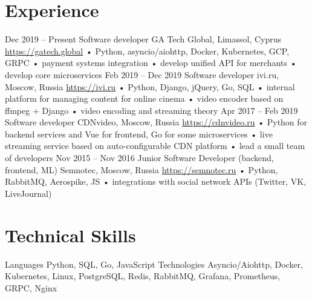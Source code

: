 \documentclass[11pt,a4paper]{moderncv}
\begin{document}
\maketitle

\section{Experience}
  \cventry
    {Dec 2019 – Present}
    {Software developer}
    {GA Tech Global, Limassol, Cyprus}
    {\url{https://gatech.global}}
    {}
    {
      • Python, asyncio/aiohttp, Docker, Kubernetes, GCP, GRPC\newline{}
      • payment systems integration\newline{}
      • develop unified API for merchants\newline{}
      • develop core microservices\newline{}
    }
  \cventry
    {Feb 2019 – Dec 2019}
    {Software developer}
    {ivi.ru, Moscow, Russia}
    {\url{https://ivi.ru}}
    {}
    {
      • Python, Django, jQuery, Go, SQL \newline{}
      • internal platform for managing content for online cinema \newline{}
      • video encoder based on ffmpeg + Django \newline{}
      • video encoding and streaming theory \newline{}
    }
  \cventry
    {Apr 2017 – Feb 2019}
    {Software developer}
    {CDNvideo, Moscow, Russia}
    {\url{https://cdnvideo.ru}}
    {}
    {
      • Python for backend services and Vue for frontend, Go for some microservices \newline{}
      • live streaming service based on auto-configurable CDN platform \newline{}
      • lead a small team of developers \newline{}
    }
  \cventry
    {Nov 2015 – Nov 2016}
    {Junior Software Developer (backend, frontend, ML)}
    {Semnotec, Moscow, Russia}
    {\url{https://semnotec.ru}}
    {}
    {
      • Python, RabbitMQ, Aerospike, JS \newline{}
      • integrations with social network APIs (Twitter, VK, LiveJournal) \newline{}
    }

\section{Technical Skills}
  \cvline
    {Languages}{
      Python,
      SQL,
      Go,
      JavaScript
    }
  \cvline
    {Technologies}{
      Asyncio/Aiohttp,
      Docker,
      Kubernetes,
      Linux,
      PostgreSQL,
      Redis,
      RabbitMQ,
      Grafana,
      Prometheus,
      GRPC,
      Nginx
    }
\end{document}
